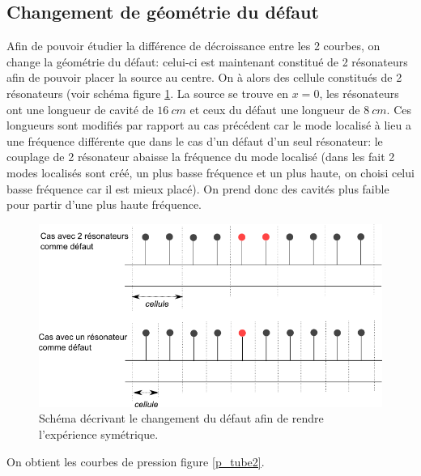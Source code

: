 \subsection{Changement de géométrie du défaut}
Afin de pouvoir étudier la différence de décroissance entre les 2 courbes, on change la géométrie du défaut: celui-ci est maintenant constitué de 2 résonateurs afin de pouvoir placer la source au centre. On à alors des cellule constitués de 2 résonateurs (voir schéma figure \ref{fig_exp}. La source se trouve en $x=0$, les résonateurs ont une longueur de cavité de $16~cm$ et ceux du défaut une longueur de $8~cm$. Ces longueurs sont modifiés par rapport au cas précédent car le mode localisé à lieu a une fréquence différente que dans le cas d'un défaut d'un seul résonateur: le couplage de 2 résonateur abaisse la fréquence du mode localisé (dans les fait 2 modes localisés sont créé, un plus basse fréquence et un plus haute, on choisi celui basse fréquence car il est mieux placé). On prend donc des cavités plus faible pour partir d'une plus haute fréquence.

\begin{figure}[!h]
\centering
\includegraphics[scale=0.3]{./images_chp3/chgmt_defaut.png}
\caption{\label{fig_exp} Schéma décrivant le changement du défaut afin de rendre l'expérience symétrique.}
\end{figure}



On obtient les courbes de pression figure \ref{p_tube2}.

